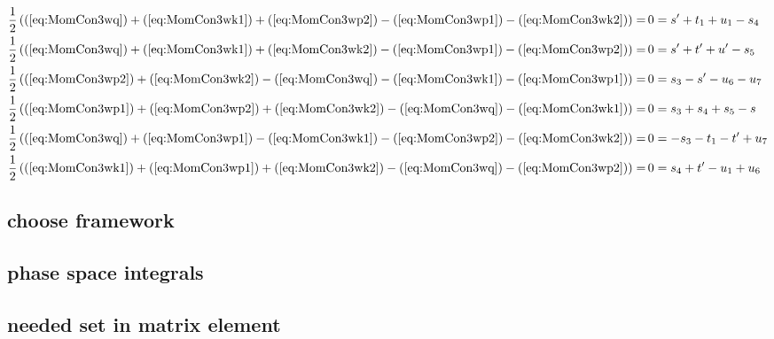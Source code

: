 \begin{align}
\frac 1 2 \left((\ref{eq:MomCon3wq}) + (\ref{eq:MomCon3wk1}) + (\ref{eq:MomCon3wp2}) - (\ref{eq:MomCon3wp1}) - (\ref{eq:MomCon3wk2})\right)=&\,0= s' + t_1 + u_1 - s_4\\
\frac 1 2 \left((\ref{eq:MomCon3wq}) + (\ref{eq:MomCon3wk1}) + (\ref{eq:MomCon3wk2}) - (\ref{eq:MomCon3wp1}) - (\ref{eq:MomCon3wp2})\right)=&\,0= s' + t' + u' - s_5 \label{eq:MonCon3s5up}\\
\frac 1 2 \left((\ref{eq:MomCon3wp2}) + (\ref{eq:MomCon3wk2}) - (\ref{eq:MomCon3wq}) - (\ref{eq:MomCon3wk1}) - (\ref{eq:MomCon3wp1})\right)=&\,0= s_3-s'-u_6-u_7\\
\frac 1 2 \left((\ref{eq:MomCon3wp1}) + (\ref{eq:MomCon3wp2}) + (\ref{eq:MomCon3wk2}) - (\ref{eq:MomCon3wq}) - (\ref{eq:MomCon3wk1})\right)=&\,0= s_3+s_4+s_5-s\\
\frac 1 2 \left((\ref{eq:MomCon3wq}) + (\ref{eq:MomCon3wp1}) - (\ref{eq:MomCon3wk1}) - (\ref{eq:MomCon3wp2}) - (\ref{eq:MomCon3wk2})\right)=&\,0=-s_3-t_1-t'+u_7\\
\frac 1 2 \left((\ref{eq:MomCon3wk1}) + (\ref{eq:MomCon3wp1}) + (\ref{eq:MomCon3wk2}) - (\ref{eq:MomCon3wq}) - (\ref{eq:MomCon3wp2})\right)=&\,0=s_4+t'-u_1+u_6
\end{align}

\subsection{choose framework}


\subsection{phase space integrals}


\subsection{needed set in matrix element}

